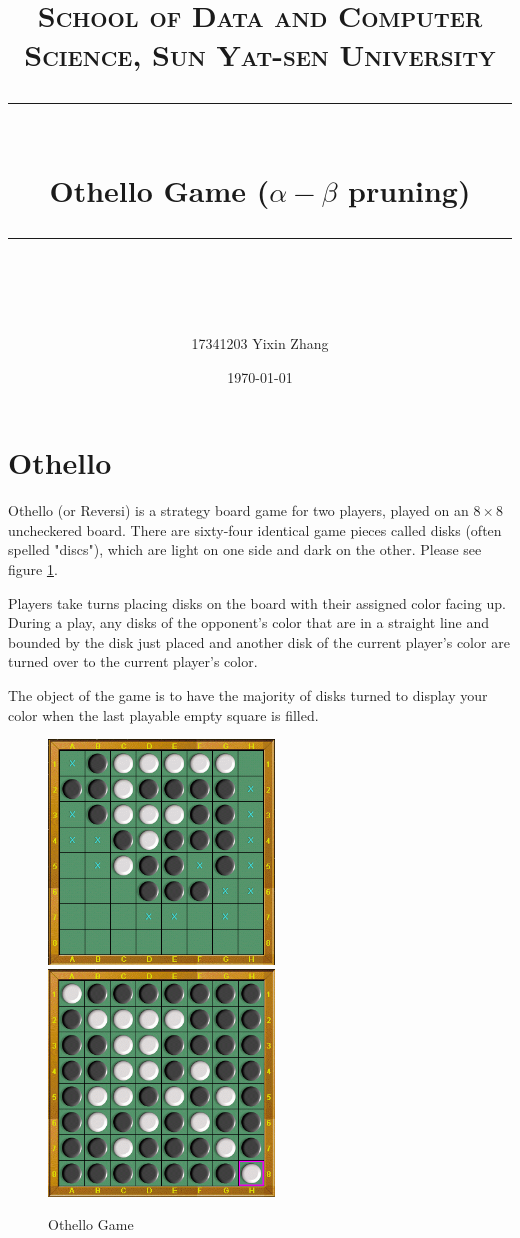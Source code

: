 \documentclass[a4paper, 11pt]{article}
\title{	
\normalfont \normalsize
\textsc{School of Data and Computer Science, Sun Yat-sen University} \\ [25pt] %
\rule{\textwidth}{0.5pt} \\[0.4cm] %
\huge Othello Game ($\alpha-\beta$ pruning) \\ %
\rule{\textwidth}{2pt} \\[0.5cm] %
\author{17341203 Yixin Zhang}
\date{\normalsize\today}
}
\begin{document}
\maketitle
\tableofcontents
\newpage

\section{Othello}
Othello (or Reversi) is a strategy board game for two players, played on an $8 \times 8$ uncheckered board. There are sixty-four identical game pieces called disks (often spelled "discs"), which are light on one side and dark on the other. Please see figure \ref{fig:othello}.

Players take turns placing disks on the board with their assigned color facing up. During a play, any disks of the opponent's color that are in a straight line and bounded by the disk just placed and another disk of the current player's color are turned over to the current player's color.

The object of the game is to have the majority of disks turned to display your color when the last playable empty square is filled.
\begin{figure}
  \centering
  \includegraphics[width=6cm]{Pic/othello}
  \qquad
  \includegraphics[width=6cm]{Pic/othello2}
  \caption{Othello Game}
  \label{fig:othello}
\end{figure}
\end{document}
